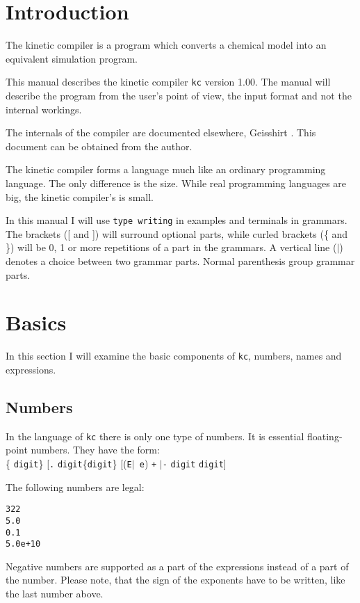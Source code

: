 \section{Introduction}
The kinetic compiler is a program which converts a chemical model into an
equivalent simulation program.

This manual describes the kinetic compiler {\tt kc} version 1.00. The manual
will describe the program from the user's point of view, \ie the input
format and not the internal workings.

The internals of the compiler are documented elsewhere, Geisshirt
\cite{kc:prog}. This document can be obtained from the author.

The kinetic compiler forms a language much like an ordinary programming 
language. The only difference is the size. While real programming languages 
are big, the kinetic compiler's is small.

In this manual I will use {\tt type writing} in examples and terminals 
in grammars. The brackets ([ and ]) will surround optional parts, 
while curled brackets (\{ and \}) will be 0, 1 or more repetitions of a 
part in the grammars. A vertical line ($|$) denotes a choice between 
two grammar parts. Normal parenthesis group grammar parts.

\newpage
\section{Basics}
In this section I will examine the basic components of {\tt kc}, \ie
numbers, names and expressions. 

\subsection{Numbers}
In the language of {\tt kc} there is only one type of numbers. It is essential
floating-point numbers. They have the form: \\
\{ {\tt digit}\} [{\tt .} {\tt digit}\{{\tt digit}\} [({\tt E}$|${\tt
e}) {\tt +} $|${\tt -} {\tt digit} {\tt digit}]

The following numbers are legal:
\begin{verbatim}
322
5.0
0.1
5.0e+10
\end{verbatim}

Negative numbers are supported as a part of the expressions instead of
a part of the number. Please note, that the sign of the exponents have
to be written, \eg like the last number above.

